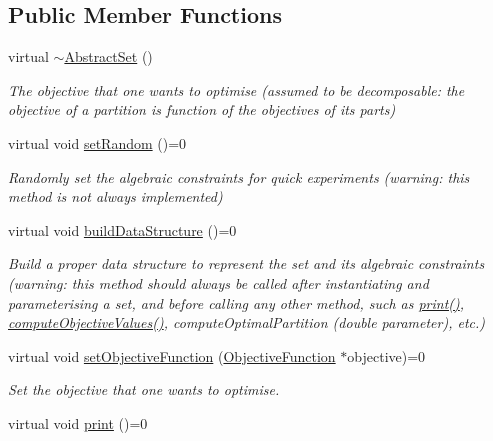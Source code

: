 \subsection*{Public Member Functions}
\begin{DoxyCompactItemize}
\item 
virtual \hyperlink{classAbstractSet_adc3db5afd11de63639ddd079ef4ecf45}{$\sim$\-Abstract\-Set} ()
\begin{DoxyCompactList}\small\item\em The objective that one wants to optimise (assumed to be decomposable\-: the objective of a partition is function of the objectives of its parts) \end{DoxyCompactList}\item 
\hypertarget{classAbstractSet_aac0cf2d0ef47c49aa0a7ac393691ff7a}{virtual void \hyperlink{classAbstractSet_aac0cf2d0ef47c49aa0a7ac393691ff7a}{set\-Random} ()=0}\label{classAbstractSet_aac0cf2d0ef47c49aa0a7ac393691ff7a}

\begin{DoxyCompactList}\small\item\em Randomly set the algebraic constraints for quick experiments (warning\-: this method is not always implemented) \end{DoxyCompactList}\item 
\hypertarget{classAbstractSet_a735009927cfae61baa66bbf7b53f76d5}{virtual void \hyperlink{classAbstractSet_a735009927cfae61baa66bbf7b53f76d5}{build\-Data\-Structure} ()=0}\label{classAbstractSet_a735009927cfae61baa66bbf7b53f76d5}

\begin{DoxyCompactList}\small\item\em Build a proper data structure to represent the set and its algebraic constraints (warning\-: this method should always be called after instantiating and parameterising a set, and before calling any other method, such as \hyperlink{classAbstractSet_ae20f14f4e4209570d26c3614c00e02df}{print()}, \hyperlink{classAbstractSet_a341945c465179a52da09356a2aa50a8d}{compute\-Objective\-Values()}, compute\-Optimal\-Partition (double parameter), etc.) \end{DoxyCompactList}\item 
virtual void \hyperlink{classAbstractSet_a7aef71679a18ab7965d1098da15b26c2}{set\-Objective\-Function} (\hyperlink{classObjectiveFunction}{Objective\-Function} $\ast$objective)=0
\begin{DoxyCompactList}\small\item\em Set the objective that one wants to optimise. \end{DoxyCompactList}\item 
\hypertarget{classAbstractSet_ae20f14f4e4209570d26c3614c00e02df}{virtual void \hyperlink{classAbstractSet_ae20f14f4e4209570d26c3614c00e02df}{print} ()=0}\label{classAbstractSet_ae20f14f4e4209570d26c3614c00e02df}


\end{DoxyCompactItemize}

